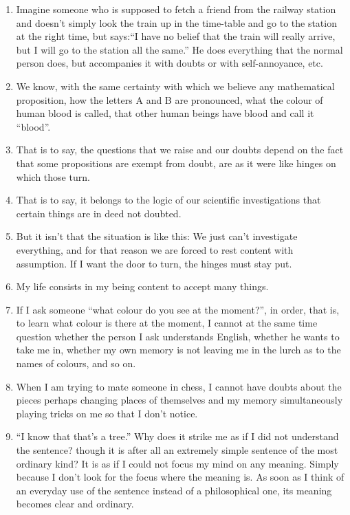 \documentclass{book}
\begin{document}
\begin{enumerate}
\item
Imagine someone who is supposed to fetch a friend from the railway station and
doesn't simply look the train up in the time-table and go to the station at the
right time, but says:``I have no belief that the train will really arrive, but
I will go to the station all the same.'' He does everything that the normal
person does, but accompanies it with doubts or with self-annoyance, etc.

\item
We know, with the same certainty with which we believe any mathematical
proposition, how the letters A and B are pronounced, what the colour of human
blood is called, that other human beings have blood and call it ``blood''.

\item
That is to say, the questions that we raise and our doubts depend on the fact
that some propositions are exempt from doubt, are as it were like hinges on
which those turn.

\item
That is to say, it belongs to the logic of our scientific investigations that
certain things are in deed not doubted.

\item
But it isn't that the situation is like this: We just can't investigate
everything, and for that reason we are forced to rest content with assumption.
If I want the door to turn, the hinges must stay put.

\item
My life consists in my being content to accept many things.

\item
If I ask someone ``what colour do you see at the moment?'', in order, that is,
to learn what colour is there at the moment, I cannot at the same time question
whether the person I ask understands English, whether he wants to take me in,
whether my own memory is not leaving me in the lurch as to the names of
colours, and so on.

\item
When I am trying to mate someone in chess, I cannot have doubts about the
pieces perhaps changing places of themselves and my memory simultaneously
playing tricks on me so that I don't notice.

\item
``I know that that's a tree.'' Why does it strike me as if I did not understand
the sentence? though it is after all an extremely simple sentence of the most
ordinary kind? It is as if I could not focus my mind on any meaning. Simply
because I don't look for the focus where the meaning is. As soon as I think of
an everyday use of the sentence instead of a philosophical one, its meaning
becomes clear and ordinary.


\end{enumerate}
\end{document}
